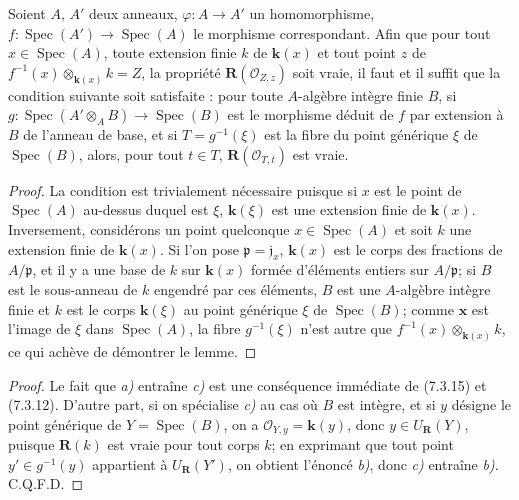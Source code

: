 \begin{lemma}[7.3.16.2]
\label{IV.2.s7.3.16.2-fr}
Soient $A$, $A'$ deux anneaux, $\varphi:A\to A'$ un homomorphisme,
$f:\operatorname{Spec}(A')\to\operatorname{Spec}(A)$ le morphisme
correspondant. Afin que pour tout $x\in\operatorname{Spec}(A)$, toute
extension finie $k$ de $\boldsymbol{k}(x)$ et tout point $z$ de
$f^{-1}(x)\otimes_{\mathbf{k}(x)}k=Z$, la propriété
$\boldsymbol R(\mathscr O_{Z,z})$ soit vraie, il faut et il suffit que la
condition suivante soit satisfaite : pour toute $A$-algèbre intègre finie
$B$, si
$g:\operatorname{Spec}(A'\otimes_A B)\to\operatorname{Spec}(B)$ est le
morphisme déduit de $f$ par extension à $B$ de l'anneau de base, et si
$T=g^{-1}(\xi)$ est la fibre du point générique $\xi$ de
$\operatorname{Spec}(B)$, alors, pour tout $t\in T$,
$\boldsymbol R(\mathscr O_{T,t})$ est vraie.
\end{lemma}

\begin{proof}
La condition est trivialement nécessaire puisque si $x$ est le point de
$\operatorname{Spec}(A)$ au-dessus duquel est $\xi$, $\boldsymbol{k}(\xi)$ est une
extension finie de $\boldsymbol{k}(x)$. Inversement, considérons un point quelconque
$x\in\operatorname{Spec}(A)$ et soit $k$ une extension finie de $\boldsymbol{k}(x)$.
Si l'on pose $\mathfrak p=\mathfrak j_x$, $\boldsymbol{k}(x)$ est le corps des
fractions de $A/\mathfrak p$, et il y a une base de $k$ sur $\boldsymbol{k}(x)$ formée
d'éléments entiers sur $A/\mathfrak p$; si $B$ est le sous-anneau de $k$
engendré par ces éléments, $B$ est une $A$-algèbre intègre finie et $k$
est le corps $\boldsymbol{k}(\xi)$ au point générique $\xi$ de
$\operatorname{Spec}(B)$; comme $\boldsymbol{x}$ est l'image de $\xi$ dans
$\operatorname{Spec}(A)$, la fibre $g^{-1}(\xi)$ n'est autre que
$f^{-1}(x)\otimes_{\mathbf{k}(x)}k$, ce qui achève de démontrer le lemme.
\end{proof}

\begin{proof}
Le fait que \emph{a)} entraîne \emph{c)} est une conséquence immédiate de (7.3.15) et
(7.3.12). D'autre part, si on spécialise \emph{c)} au cas où $B$ est intègre, et
si $y$ désigne le point générique de $Y=\operatorname{Spec}(B)$, on a
$\mathscr O_{Y,y}=\boldsymbol{k}(y)$, donc $y\in U_{\mathbf{R}}(Y)$, puisque
$\boldsymbol R(k)$ est vraie pour tout corps $k$; en exprimant que tout
point $y'\in g^{-1}(y)$ appartient à $U_{\mathbf{R}}(Y')$, on obtient
l'énoncé \emph{b)}, donc \emph{c)} entraîne \emph{b)}. C.Q.F.D.
\end{proof}

